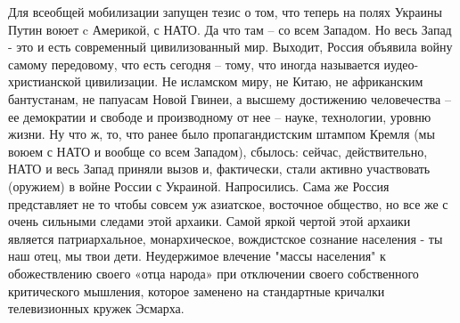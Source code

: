 Для всеобщей мобилизации запущен тезис о том,
что
теперь на полях Украины Путин воюет c Америкой, с НАТО. Да что
там – со
всем Западом. Но весь Запад - это и есть современный
цивилизованный мир.
Выходит, Россия объявила войну самому передовому, что есть
сегодня –
тому, что иногда называется иудео-христианской цивилизации. Не
исламском миру,
не Китаю, не африканским бантустанам, не папуасам Новой Гвинеи, а
высшему
достижению человечества – ее демократии и свободе и производному
от нее –
науке, технологии, уровню жизни. Ну что ж, то, что ранее было
пропагандистским штампом Кремля (мы воюем с НАТО и вообще со всем
Западом),
сбылось: сейчас, действительно, НАТО и весь Запад приняли вызов и,
фактически,
стали активно участвовать (оружием) в войне России с Украиной.
Напросились.
Сама же Россия представляет не то чтобы совсем уж азиатское,
восточное
общество, но все же с очень сильными следами этой архаики. Самой
яркой
чертой этой архаики является патриархальное, монархическое,
вождистское
сознание населения - ты наш отец, мы твои дети. Неудержимое
влечение
"массы населения" к обожествлению своего «отца народа» при
отключении
своего собственного критического мышления, которое заменено на
стандартные кричалки телевизионных кружек Эсмарха.


